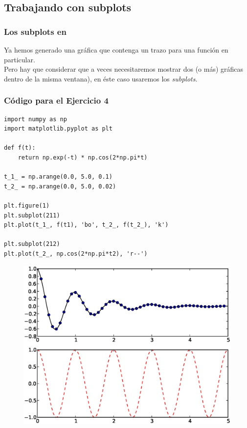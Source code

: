 \subsection{Trabajando con subplots}
\begin{frame}
\frametitle{Los subplots en \python}
Ya hemos generado una gráfica que contenga un trazo para una función en particular.
\\
\bigskip
Pero hay que considerar que a veces necesitaremos mostrar dos (o más) gráficas dentro de la misma ventana), en éste caso usaremos los \emph{subplots}.
\end{frame}
\begin{frame}
\frametitle{Código para el Ejercicio 4}
\begin{lstlisting}[style=codigopython]
import numpy as np
import matplotlib.pyplot as plt

def f(t):
    return np.exp(-t) * np.cos(2*np.pi*t)

t_1_ = np.arange(0.0, 5.0, 0.1)
t_2_ = np.arange(0.0, 5.0, 0.02)

plt.figure(1)
plt.subplot(211)
plt.plot(t_1_, f(t1), 'bo', t_2_, f(t_2_), 'k')

plt.subplot(212)
plt.plot(t_2_, np.cos(2*np.pi*t2), 'r--')
\end{lstlisting}
\end{frame}
\begin{frame}[fragile]
\begin{figure}
	\centering
	\includegraphics[scale=0.5]{Imagenes/plotEjercicio4.eps}
\end{figure}
\end{frame}
